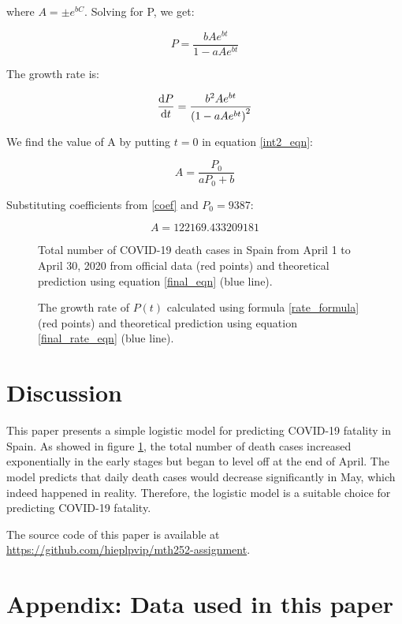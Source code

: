 \documentclass[12pt]{scrartcl}
\begin{document}
where $A = \pm e^{bC}$. Solving for P, we get:

\begin{equation} \label{final_eqn}
P = \frac{bAe^{bt}}{1 - aAe^{bt}}
\end{equation}

The growth rate is:

\begin{equation} \label{final_rate_eqn}
\diff{P}{t} = \frac{b^2Ae^{bt}}{\left ( 1 - aAe^{bt} \right ) ^2}
\end{equation}

We find the value of A by putting $t = 0$ in equation \ref{int2_eqn}:

\begin{equation*}
A = \frac{P_0}{aP_0 + b}
\end{equation*}

Substituting coefficients from \ref{coef} and $P_0 = 9387$:

\begin{equation*}
A = 122169.433209181
\end{equation*}

\begin{figure}[H]
  \begin{center}
    
  \end{center}
  \caption{Total number of COVID-19 death cases in Spain from April 1 to
  April 30, 2020 from official data (red points) and theoretical prediction
  using equation \ref{final_eqn} (blue line).}
  \label{prediction}
\end{figure}

\begin{figure}[H]
  \begin{center}
    
  \end{center}
  \caption{The growth rate of $P(t)$ calculated using formula \ref{rate_formula} (red points)
  and theoretical prediction using equation \ref{final_rate_eqn} (blue line).}
\end{figure}

\section*{Discussion}

This paper presents a simple logistic model for predicting COVID-19 fatality in Spain.
As showed in figure \ref{prediction}, the total number of death cases increased
exponentially in the early stages but began to level off at the end of April.
The model predicts that daily death cases would decrease significantly in May,
which indeed happened in reality. Therefore, the logistic model is a suitable
choice for predicting COVID-19 fatality.

The source code of this paper is available at
\url{https://github.com/hieplpvip/mth252-assignment}.

\printbibliography

\newpage

\appendix
\section*{Appendix: Data used in this paper}


\end{document}
